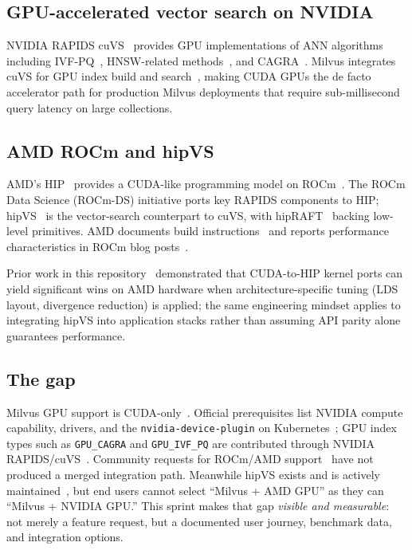 \documentclass[11pt,a4paper]{article}
\begin{document}
\subsection{GPU-accelerated vector search on NVIDIA}

NVIDIA RAPIDS cuVS~\cite{cuvs-docs,cuvs-github,rapids-home,rapids-github}
provides GPU implementations of ANN algorithms including IVF-PQ~\cite{ivfpq-jegou},
HNSW-related methods~\cite{hnsw-paper}, and CAGRA~\cite{nvidia-cagra}.
Milvus integrates cuVS for GPU index build and search~\cite{milvus-gpu-index,milvus-gpu-cagra},
making CUDA GPUs the de facto accelerator path for production Milvus deployments
that require sub-millisecond query latency on large collections.

\subsection{AMD ROCm and hipVS}

AMD's HIP~\cite{hip-docs,hip-porting,hipify-device-api} provides a CUDA-like
programming model on ROCm~\cite{rocm-prog-guide}.
The ROCm Data Science (ROCm-DS) initiative ports key RAPIDS components to HIP;
hipVS~\cite{hipvs-docs,hipvs-whatis,hipvs-github,rocm-ds-overview} is the
vector-search counterpart to cuVS, with hipRAFT~\cite{hipraft-github} backing
low-level primitives.
AMD documents build instructions~\cite{hipvs-build} and reports performance
characteristics in ROCm blog posts~\cite{hipvs-blog}.

Prior work in this repository~\cite{cuda-to-hip-repo} demonstrated that
CUDA-to-HIP kernel ports can yield significant wins on AMD hardware when
architecture-specific tuning (LDS layout, divergence reduction) is applied;
the same engineering mindset applies to integrating hipVS into application stacks
rather than assuming API parity alone guarantees performance.

\subsection{The gap}

Milvus GPU support is CUDA-only~\cite{milvus-gpu-index,milvus-prerequisite-gpu}.
Official prerequisites list NVIDIA compute capability, drivers, and the
\texttt{nvidia-device-plugin} on Kubernetes~\cite{milvus-prerequisite-gpu};
GPU index types such as \texttt{GPU\_CAGRA} and \texttt{GPU\_IVF\_PQ} are
contributed through NVIDIA RAPIDS/cuVS~\cite{milvus-gpu-cagra,milvus-gpu-index}.
Community requests for ROCm/AMD support~\cite{milvus-rocm-issue} have not
produced a merged integration path.
Meanwhile hipVS exists and is actively maintained~\cite{hipvs-github}, but
end users cannot select ``Milvus + AMD GPU'' as they can ``Milvus + NVIDIA GPU.''
This sprint makes that gap \emph{visible and measurable}: not merely a feature
request, but a documented user journey, benchmark data, and integration options.
\end{document}
